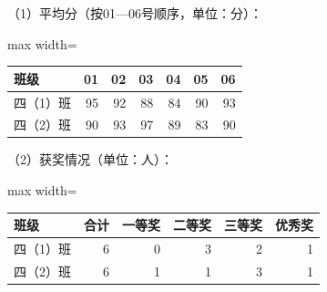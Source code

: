 
\begingroup\color{answerred}（1）平均分（按01—06号顺序，单位：分）：
\par\smallskip\begin{adjustbox}{max width=\linewidth}\begin{tabular}{lrrrrrr}\toprule 班级&01&02&03&04&05&06\\\midrule
四（1）班&95&92&88&84&90&93\\四（2）班&90&93&97&89&83&90\\\bottomrule\end{tabular}\end{adjustbox}
\par\smallskip（2）获奖情况（单位：人）：
\par\smallskip\begin{adjustbox}{max width=\linewidth}\begin{tabular}{lrrrrr}\toprule 班级&合计&一等奖&二等奖&三等奖&优秀奖\\\midrule
四（1）班&6&0&3&2&1\\四（2）班&6&1&1&3&1\\\bottomrule\end{tabular}\end{adjustbox}\par\endgroup
